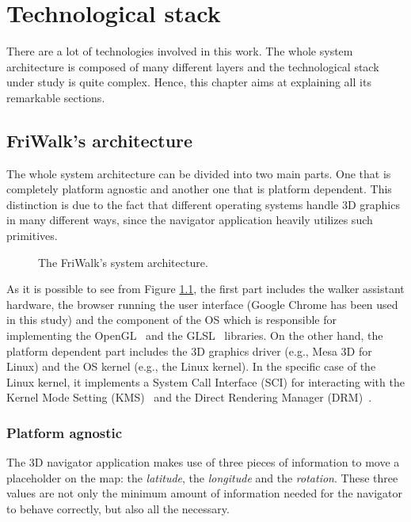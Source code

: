 \chapter{Technological stack} \label{cha:tech_stack}

There are a lot of technologies involved in this work. The whole system
architecture is composed of many different layers and the technological
stack under study is quite complex. Hence, this chapter aims at explaining
all its remarkable sections.


\section{FriWalk's architecture}\label{sec:friwalk_architecture}
The whole system architecture can be divided into two main parts. One that
is completely platform agnostic and another one that is platform dependent.
This distinction is due to the fact that different operating systems handle
3D graphics in many different ways, since the navigator application heavily
utilizes such primitives.
\begin{figure}[!htb]
    \caption{The FriWalk's system architecture.}
    \label{img:system_arch}
\end{figure}

As it is possible to see from Figure \ref{img:system_arch}, the first part includes
the walker assistant hardware, the browser running the
user interface (Google Chrome has been used in this study) and the component of
the OS which is responsible for implementing the OpenGL~\cite{woo1999opengl}
and the GLSL~\cite{marroquim2009introduction} libraries. On the other hand,
the platform dependent part includes the 3D graphics driver (e.g., Mesa 3D for
Linux) and the OS kernel (e.g., the Linux kernel). In the specific case of the
Linux kernel, it implements a System Call Interface (SCI) for interacting
with the Kernel Mode Setting (KMS)~\cite{linuxkms} and the Direct Rendering Manager
(DRM)~\cite{paul2000introduction}.


\subsection{Platform agnostic}
The 3D navigator application makes use of three pieces of information to move a
placeholder on the map: the \emph{latitude}, the \emph{longitude} and the
\emph{rotation}. These three values are not only the minimum amount of information
needed for the navigator to behave correctly, but also all the necessary.

